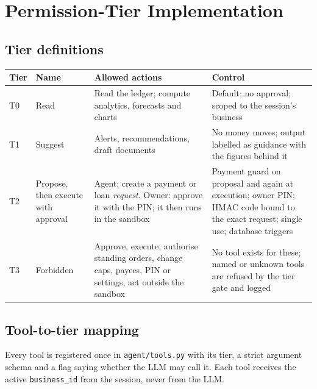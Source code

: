 \documentclass[10pt,a4paper]{article}
\newcommand{\code}[1]{\texttt{\small #1}}
\begin{document}
\section{Permission-Tier Implementation}
\label{sec:tiers}

\subsection{Tier definitions}
\begin{center}
\begin{tabularx}{\textwidth}{@{}p{0.8cm}L{2.6cm}L{4.6cm}Y@{}}
\toprule
\textbf{Tier} & \textbf{Name} & \textbf{Allowed actions} & \textbf{Control}\\
\midrule
T0 & Read & Read the ledger; compute analytics, forecasts and charts & Default; no approval; scoped to the session's business\\
T1 & Suggest & Alerts, recommendations, draft documents & No money moves; output labelled as guidance with the figures behind it\\
T2 & Propose, then execute with approval & Agent: create a payment or loan \emph{request}. Owner: approve it with the PIN; it then runs in the sandbox & Payment guard on proposal and again at execution; owner PIN; HMAC code bound to the exact request; single use; database triggers\\
T3 & Forbidden & Approve, execute, authorise standing orders, change caps, payees, PIN or settings, act outside the sandbox & No tool exists for these; named or unknown tools are refused by the tier gate and logged\\
\bottomrule
\end{tabularx}
\end{center}

\subsection{Tool-to-tier mapping}
Every tool is registered once in \code{agent/tools.py} with its tier, a strict argument schema and a flag saying whether the LLM may call it. Each tool receives the active \code{business\_id} from the session, never from the LLM.
\end{document}
